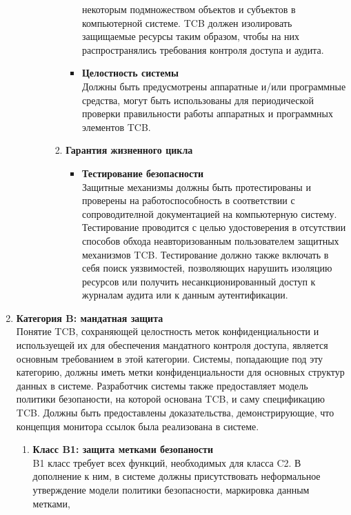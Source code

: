 \begin{enumerate}
\begin{enumerate}
\begin{enumerate}
\begin{enumerate}
\begin{itemize}
					некоторым подмножеством объектов и субъектов в компьютерной системе. TCB должен изолировать защищаемые ресурсы таким образом, чтобы на них распространялись требования контроля
					доступа и аудита.
					\item{\textbf{Целостность системы}}\\
					Должны быть предусмотрены аппаратные и/или программные средства, могут быть использованы для периодической проверки правильности работы аппаратных и программных элементов TCB.
				\end{itemize}
				\item{\textbf{Гарантия жизненного цикла}}
				\begin{itemize}
					\item{\textbf{Тестирование безопасности}}\\
					Защитные механизмы должны быть протестированы и проверены на работоспособность в соответствии с сопроводителной документацией на компьютерную систему.
					Тестирование проводится с целью удостоверения в отсутствии способов обхода неавторизованным пользователем защитных механизмов TCB. Тестирование должно также включать в себя
					поиск уязвимостей, позволяющих нарушить изоляцию ресурсов или получить несанкционированный доступ к журналам аудита или к данным аутентификации. 
				\end{itemize}
			\end{enumerate}
		\end{enumerate}
	\end{enumerate}
	\item{\textbf{Категория B: мандатная защита}}\\
	Понятие TCB, сохраняющей целостность меток конфиденциальности и используещей их для обеспечения мандатного контроля доступа, является основным требованием в этой категории. Системы, попадающие
	под эту категорию, должны иметь метки конфиденциальности для основных структур данных в системе. Разработчик системы также предоставляет модель политики безопаности, на которой основана TCB, и
	саму спецификацию TCB. Должны быть предоставлены доказательства, демонстрирующие, что концепция монитора ссылок была реализована в системе.  	 
	\begin{enumerate}
		\item{\textbf{Класс B1: защита метками безопаности}}\\
		B1 класс требует всех функций, необходимых для класса C2. В дополнение к ним, в системе должны присутствовать неформальное утверждение модели политики безопасности, маркировка данным метками,

\end{enumerate}
\end{enumerate}
